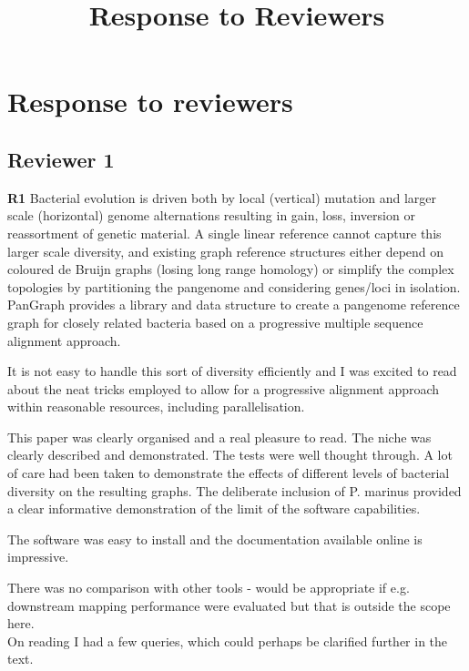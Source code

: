 \documentclass[aps,rmp,onecolumn]{revtex4-1}
\title{Response to Reviewers}
\newcommand{\review}[1]{\textbf{#1}}
\begin{document}
\maketitle

\section*{Response to reviewers}

\subsection*{Reviewer 1}

\review{R1} Bacterial evolution is driven both by local (vertical) mutation and larger scale (horizontal) genome alternations resulting in gain, loss, inversion or reassortment of genetic material. A single linear reference cannot capture this larger scale diversity, and existing graph reference structures either depend on coloured de Bruijn graphs (losing long range homology) or simplify the complex topologies by partitioning the pangenome and considering genes/loci in isolation. PanGraph provides a library and data structure to create a pangenome reference graph for closely related bacteria based on a progressive multiple sequence alignment approach.

It is not easy to handle this sort of diversity efficiently and I was excited to read about the neat tricks employed to allow for a progressive alignment approach within reasonable resources, including parallelisation.

This paper was clearly organised and a real pleasure to read. The niche was clearly described and demonstrated. The tests were well thought through. A lot of care had been taken to demonstrate the effects of different levels of bacterial diversity on the resulting graphs. The deliberate inclusion of P. marinus provided a clear informative demonstration of the limit of the software capabilities.

The software was easy to install and the documentation available online is impressive.

There was no comparison with other tools - would be appropriate if e.g. downstream mapping performance were evaluated but that is outside the scope here.\\

On reading I had a few queries, which could perhaps be clarified further in the text.
\end{document}
